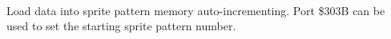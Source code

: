 \\
Load data into sprite pattern memory auto-incrementing. Port \$303B
can be used to set the starting sprite pattern number.

